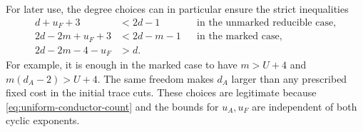 For later use, the degree choices can in particular ensure the strict
inequalities
\begin{align}
 d+u_F+3&<2d-1 &&\text{in the unmarked reducible case},\label{eq:field-unmarked-gap}\\
 2d-2m+u_F+3&<2d-m-1 &&\text{in the marked case},\label{eq:field-marked-gap}\\
 2d-2m-4-u_F&>d.\label{eq:field-curve-gap}
\end{align}
For example, it is enough in the marked case to have
$m>U+4$ and $m(d_A-2)>U+4$.  The same freedom makes $d_A$
larger than any prescribed fixed cost in the initial trace cuts.
These choices are legitimate because \eqref{eq:uniform-conductor-count}
and the bounds for $u_A,u_F$ are independent of both cyclic exponents.

